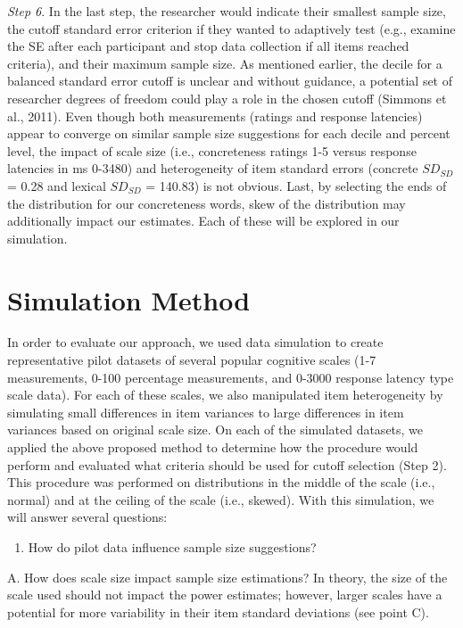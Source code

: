 \documentclass[
  man]{apa7}
\providecommand{\tightlist}{%
  \setlength{\itemsep}{0pt}\setlength{\parskip}{0pt}}
\begin{document}
\emph{Step 6}. In the last step, the researcher would indicate their smallest sample size, the cutoff standard error criterion if they wanted to adaptively test (e.g., examine the SE after each participant and stop data collection if all items reached criteria), and their maximum sample size. As mentioned earlier, the decile for a balanced standard error cutoff is unclear and without guidance, a potential set of researcher degrees of freedom could play a role in the chosen cutoff (Simmons et al., 2011). Even though both measurements (ratings and response latencies) appear to converge on similar sample size suggestions for each decile and percent level, the impact of scale size (i.e., concreteness ratings 1-5 versus response latencies in ms 0-3480) and heterogeneity of item standard errors (concrete \(SD_{SD}\) = 0.28 and lexical \(SD_{SD}\) = 140.83) is not obvious. Last, by selecting the ends of the distribution for our concreteness words, skew of the distribution may additionally impact our estimates. Each of these will be explored in our simulation.

\hypertarget{simulation-method}{%
\section{Simulation Method}\label{simulation-method}}

In order to evaluate our approach, we used data simulation to create representative pilot datasets of several popular cognitive scales (1-7 measurements, 0-100 percentage measurements, and 0-3000 response latency type scale data). For each of these scales, we also manipulated item heterogeneity by simulating small differences in item variances to large differences in item variances based on original scale size. On each of the simulated datasets, we applied the above proposed method to determine how the procedure would perform and evaluated what criteria should be used for cutoff selection (Step 2). This procedure was performed on distributions in the middle of the scale (i.e., normal) and at the ceiling of the scale (i.e., skewed). With this simulation, we will answer several questions:

\begin{enumerate}
\def\labelenumi{\arabic{enumi})}
\tightlist
\item
  How do pilot data influence sample size suggestions?
\end{enumerate}

A. How does scale size impact sample size estimations? In theory, the size of the scale used should not impact the power estimates; however, larger scales have a potential for more variability in their item standard deviations (see point C).
\end{document}
